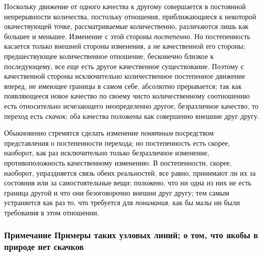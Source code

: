 Поскольку движение от одного качества к другому совершается в постоянной
непрерывности количества, постольку отношения, приближающиеся к некоторой
окачествующей точке, рассматриваемые количественно, различаются лишь как
большее и меньшее. Изменение с этой стороны
{\em постепенно}. Но постепенность касается только
внешней стороны изменения, а не качественной его стороны; предшествующее
количественное отношение, бесконечно близкое к последующему, все еще есть
другое качественное существование. Поэтому с качественной стороны
исключительно количественное постепенное движение вперед, не имеющее
границы в самом себе, абсолютно прерывается; так как появляющееся новое
качество по своему чисто количественному соотношению есть относительно
исчезающего неопределенно другое, безразличное качество, то переход есть
{\em скачок}; оба качества положены как совершенно
внешние друг другу.

Обыкновенно стремятся сделать изменение {\em понятным}
посредством представления о постепенности перехода; но постепенность есть
скорее, наоборот, как раз исключительно только безразличное изменение,
противоположность качественному изменению. В постепенности, скорее,
наоборот, упраздняется связь обеих реальностей, все равно, принимают ли их
за состояния или за самостоятельные вещи; положено, что ни одна из них не
есть граница другой и что они безоговорочно внешни друг другу; тем самым
устраняется как раз то, что требуется для
{\em понимания}, как бы малы ни были требования в этом
отношении.


\subsubsection[Примечание Примеры таких узловых линий; о том, что якобы в природе нет скачков]
{Примечание Примеры таких узловых линий; о том, что якобы в природе нет скачков}

